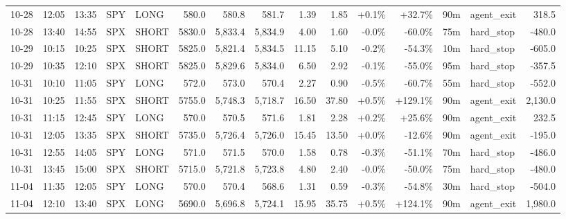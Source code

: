 \documentclass[11pt,a4paper,twoside]{article}
\begin{document}
\begin{landscape}
\begin{center}
\begin{longtable}{>{\color{txtmain}}l l l l l r r r r r r r r >{\color{txtmain}}l r}
10-28 & 12:05 & 13:35 & SPY & LONG & 580.0 & 580.8 & 581.7 & 1.39 & 1.85 & \textcolor{wingreen}{+0.1\%} & \textcolor{wingreen}{+32.7\%} & 90m & agent\_exit & \textcolor{wingreen}{318.5} \\
10-28 & 13:40 & 14:55 & SPX & SHORT & 5830.0 & 5,833.4 & 5,834.9 & 4.00 & 1.60 & \textcolor{lossred}{-0.0\%} & \textcolor{lossred}{-60.0\%} & 75m & hard\_stop & \textcolor{lossred}{-480.0} \\
10-29 & 10:15 & 10:25 & SPX & SHORT & 5825.0 & 5,821.4 & 5,834.5 & 11.15 & 5.10 & \textcolor{lossred}{-0.2\%} & \textcolor{lossred}{-54.3\%} & 10m & hard\_stop & \textcolor{lossred}{-605.0} \\
10-29 & 10:35 & 12:10 & SPX & SHORT & 5825.0 & 5,829.6 & 5,834.0 & 6.50 & 2.92 & \textcolor{lossred}{-0.1\%} & \textcolor{lossred}{-55.0\%} & 95m & hard\_stop & \textcolor{lossred}{-357.5} \\
10-31 & 10:10 & 11:05 & SPY & LONG & 572.0 & 573.0 & 570.4 & 2.27 & 0.90 & \textcolor{lossred}{-0.5\%} & \textcolor{lossred}{-60.7\%} & 55m & hard\_stop & \textcolor{lossred}{-552.0} \\
10-31 & 10:25 & 11:55 & SPX & SHORT & 5755.0 & 5,748.3 & 5,718.7 & 16.50 & 37.80 & \textcolor{wingreen}{+0.5\%} & \textcolor{wingreen}{+129.1\%} & 90m & agent\_exit & \textcolor{wingreen}{2,130.0} \\
10-31 & 11:15 & 12:45 & SPY & LONG & 570.0 & 570.5 & 571.6 & 1.81 & 2.28 & \textcolor{wingreen}{+0.2\%} & \textcolor{wingreen}{+25.6\%} & 90m & agent\_exit & \textcolor{wingreen}{232.5} \\
10-31 & 12:05 & 13:35 & SPX & SHORT & 5735.0 & 5,726.4 & 5,726.0 & 15.45 & 13.50 & \textcolor{wingreen}{+0.0\%} & \textcolor{lossred}{-12.6\%} & 90m & agent\_exit & \textcolor{lossred}{-195.0} \\
10-31 & 12:55 & 14:05 & SPY & LONG & 571.0 & 571.5 & 570.0 & 1.58 & 0.78 & \textcolor{lossred}{-0.3\%} & \textcolor{lossred}{-51.1\%} & 70m & hard\_stop & \textcolor{lossred}{-486.0} \\
10-31 & 13:45 & 15:00 & SPX & SHORT & 5715.0 & 5,721.8 & 5,723.8 & 4.80 & 2.40 & \textcolor{lossred}{-0.0\%} & \textcolor{lossred}{-50.0\%} & 75m & hard\_stop & \textcolor{lossred}{-480.0} \\
11-04 & 11:35 & 12:05 & SPY & LONG & 570.0 & 570.4 & 568.6 & 1.31 & 0.59 & \textcolor{lossred}{-0.3\%} & \textcolor{lossred}{-54.8\%} & 30m & hard\_stop & \textcolor{lossred}{-504.0} \\
11-04 & 12:10 & 13:40 & SPX & LONG & 5690.0 & 5,696.8 & 5,724.1 & 15.95 & 35.75 & \textcolor{wingreen}{+0.5\%} & \textcolor{wingreen}{+124.1\%} & 90m & agent\_exit & \textcolor{wingreen}{1,980.0} \\

\end{longtable}
\end{center}
\end{landscape}
\end{document}
